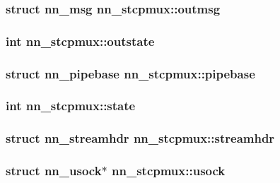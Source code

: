 \subsubsection[{outmsg}]{\setlength{\rightskip}{0pt plus 5cm}struct {\bf nn\+\_\+msg} nn\+\_\+stcpmux\+::outmsg}\hypertarget{structnn__stcpmux_abe390b012b46096d47ba8660cee75330}{}\label{structnn__stcpmux_abe390b012b46096d47ba8660cee75330}
\subsubsection[{outstate}]{\setlength{\rightskip}{0pt plus 5cm}int nn\+\_\+stcpmux\+::outstate}\hypertarget{structnn__stcpmux_a8c32969964826f07577f6f2d3f5e4d09}{}\label{structnn__stcpmux_a8c32969964826f07577f6f2d3f5e4d09}
\subsubsection[{pipebase}]{\setlength{\rightskip}{0pt plus 5cm}struct {\bf nn\+\_\+pipebase} nn\+\_\+stcpmux\+::pipebase}\hypertarget{structnn__stcpmux_a1808787c61208adc62e4031b3686e10c}{}\label{structnn__stcpmux_a1808787c61208adc62e4031b3686e10c}
\subsubsection[{state}]{\setlength{\rightskip}{0pt plus 5cm}int nn\+\_\+stcpmux\+::state}\hypertarget{structnn__stcpmux_a7d61af0bb8deb581093f7f038be8d3c1}{}\label{structnn__stcpmux_a7d61af0bb8deb581093f7f038be8d3c1}
\subsubsection[{streamhdr}]{\setlength{\rightskip}{0pt plus 5cm}struct {\bf nn\+\_\+streamhdr} nn\+\_\+stcpmux\+::streamhdr}\hypertarget{structnn__stcpmux_a6e0e4eb9a4390a90c2e681506c97ab26}{}\label{structnn__stcpmux_a6e0e4eb9a4390a90c2e681506c97ab26}
\subsubsection[{usock}]{\setlength{\rightskip}{0pt plus 5cm}struct {\bf nn\+\_\+usock}$\ast$ nn\+\_\+stcpmux\+::usock}\hypertarget{structnn__stcpmux_a9d1942933afe0c3ce956c4045286680f}{}\label{structnn__stcpmux_a9d1942933afe0c3ce956c4045286680f}

